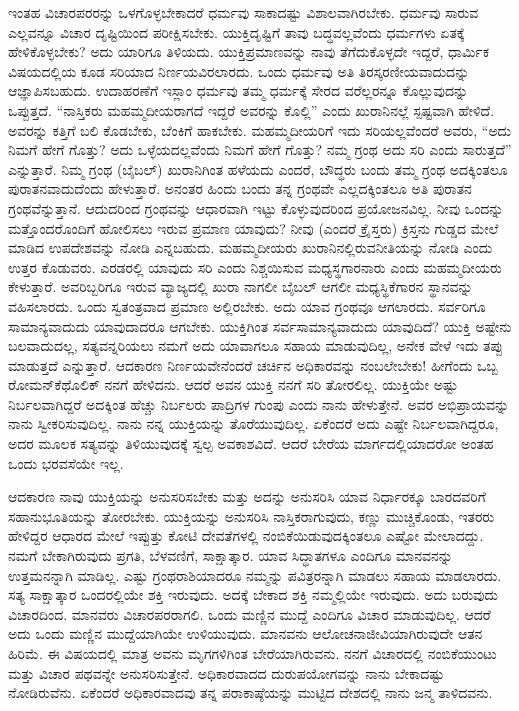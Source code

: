 ಇಂತಹ ವಿಚಾರಪರರನ್ನು ಒಳಗೊಳ್ಳಬೇಕಾದರೆ ಧರ್ಮವು ಸಾಕಾದಷ್ಟು ವಿಶಾಲವಾಗಿರಬೇಕು. ಧರ್ಮವು ಸಾರುವ ಎಲ್ಲವನ್ನೂ ವಿಚಾರ ದೃಷ್ಟಿಯಿಂದ ಪರೀಕ್ಷಿಸಬೇಕು. ಯುಕ್ತಿದೃಷ್ಟಿಗೆ ತಾವು ಬದ್ಧವಲ್ಲವೆಂದು ಧರ್ಮಗಳು ಏತಕ್ಕೆ ಹೇಳಿಕೊಳ್ಳಬೇಕು? ಅದು ಯಾರಿಗೂ ತಿಳಿಯದು. ಯುಕ್ತಿಪ್ರಮಾಣವನ್ನು ನಾವು ತೆಗೆದುಕೊಳ್ಳದೇ ಇದ್ದರೆ, ಧಾರ್ಮಿಕ ವಿಷಯದಲ್ಲಿಯ ಕೂಡ ಸರಿಯಾದ ನಿರ್ಣಯವಿರಲಾರದು. ಒಂದು ಧರ್ಮವು ಅತಿ ತಿರಸ್ಕರಣೀಯವಾದುದನ್ನು ಆಜ್ಞಾಪಿಸಬಹುದು. ಉದಾಹರಣೆಗೆ ಇಸ್ಲಾಂ ಧರ್ಮವು ತಮ್ಮ ಧರ್ಮಕ್ಕೆ ಸೇರದ ವರೆಲ್ಲರನ್ನೂ ಕೊಲ್ಲುವುದನ್ನು ಒಪ್ಪುತ್ತದೆ. “ನಾಸ್ತಿಕರು ಮಹಮ್ಮದೀಯರಾಗದೆ ಇದ್ದರೆ ಅವರನ್ನು ಕೊಲ್ಲಿ” ಎಂದು ಖುರಾನಿನಲ್ಲೆ ಸ್ಪಷ್ಟವಾಗಿ ಹೇಳಿದೆ. ಅವರನ್ನು ಕತ್ತಿಗೆ ಬಲಿ ಕೊಡಬೇಕು, ಬೆಂಕಿಗೆ ಹಾಕಬೇಕು. ಮಹಮ್ಮದೀಯರಿಗೆ ಇದು ಸರಿಯಲ್ಲವೆಂದರೆ ಅವರು, “ಅದು ನಿಮಗೆ ಹೇಗೆ ಗೊತ್ತು? ಅದು ಒಳ್ಳೆಯದಲ್ಲವೆಂದು ನಿಮಗೆ ಹೇಗೆ ಗೊತ್ತು? ನಮ್ಮ ಗ್ರಂಥ ಅದು ಸರಿ ಎಂದು ಸಾರುತ್ತದೆ” ಎನ್ನುತ್ತಾರೆ. ನಿಮ್ಮ ಗ್ರಂಥ (ಬೈಬಲ್​) ಖುರಾನಿಗಿಂತ ಹಳೆಯದು ಎಂದರೆ, ಬೌದ್ಧರು ಬಂದು ತಮ್ಮ ಗ್ರಂಥ ಅದಕ್ಕಿಂತಲೂ ಪುರಾತನವಾದುದೆಂದು ಹೇಳುತ್ತಾರೆ. ಅನಂತರ ಹಿಂದು ಬಂದು ತನ್ನ ಗ್ರಂಥವೇ ಎಲ್ಲದಕ್ಕಿಂತಲೂ ಅತಿ ಪುರಾತನ ಗ್ರಂಥವೆನ್ನುತ್ತಾನೆ. ಆದುದರಿಂದ ಗ್ರಂಥವನ್ನು ಆಧಾರವಾಗಿ ಇಟ್ಟು ಕೊಳ್ಳುವುದರಿಂದ ಪ್ರಯೋಜನವಿಲ್ಲ. ನೀವು ಒಂದನ್ನು ಮತ್ತೊಂದರೊಂದಿಗೆ ಹೋಲಿಸಲು ಇರುವ ಪ್ರಮಾಣ ಯಾವುದು? ನೀವು (ಎಂದರೆ ಕ್ರೈಸ್ತರು) ಕ್ರಿಸ್ತನು ಗುಡ್ಡದ ಮೇಲೆ ಮಾಡಿದ ಉಪದೇಶವನ್ನು ನೋಡಿ ಎನ್ನಬಹುದು. ಮಹಮ್ಮದೀಯರು ಖುರಾನಿನಲ್ಲಿರುವ\break ನೀತಿಯನ್ನು ನೋಡಿ ಎಂದು ಉತ್ತರ ಕೊಡುವರು. ಎರಡರಲ್ಲಿ ಯಾವುದು ಸರಿ ಎಂದು ನಿಶ್ಚಯಿಸುವ ಮಧ್ಯಸ್ಥಗಾರನಾರು ಎಂದು ಮಹಮ್ಮದೀಯರು ಕೇಳುತ್ತಾರೆ. ಅವರಿಬ್ಬರಿಗೂ ಇರುವ ವ್ಯಾಜ್ಯದಲ್ಲಿ ಖುರಾ ನಾಗಲೀ ಬೈಬಲ್​ ಆಗಲೀ ಮಧ್ಯಸ್ಥಿಕೆಗಾರನ ಸ್ಥಾನವನ್ನು ವಹಿಸಲಾರದು. ಒಂದು ಸ್ವತಂತ್ರವಾದ ಪ್ರಮಾಣ ಅಲ್ಲಿರಬೇಕು. ಅದು ಯಾವ ಗ್ರಂಥವೂ ಆಗಲಾರದು. ಸರ್ವರಿಗೂ ಸಾಮಾನ್ಯವಾದುದು ಯಾವುದಾದರೂ ಆಗಬೇಕು. ಯುಕ್ತಿಗಿಂತ ಸರ್ವಸಾಮಾನ್ಯವಾದುದು ಯಾವುದಿದೆ? ಯುಕ್ತಿ ಅಷ್ಟೇನು ಬಲವಾದುದಲ್ಲ, ಸತ್ಯವನ್ನರಿಯಲು ನಮಗೆ ಅದು ಯಾವಾಗಲೂ ಸಹಾಯ ಮಾಡುವುದಿಲ್ಲ, ಅನೇಕ ವೇಳೆ ಇದು ತಪ್ಪು ಮಾಡುತ್ತದೆ ಎನ್ನುತ್ತಾರೆ. ಆದಕಾರಣ ನಿರ್ಣಯವೇನೆಂದರೆ ಚರ್ಚಿನ ಅಧಿಕಾರವನ್ನು ನಂಬಲೇಬೇಕು! ಹೀಗೆಂದು ಒಬ್ಬ ರೋಮನ್​ ಕೆಥೊಲಿಕ್​ ನನಗೆ ಹೇಳಿದನು. ಆದರೆ ಅವನ ಯುಕ್ತಿ ನನಗೆ ಸರಿ ತೋರಲಿಲ್ಲ. ಯುಕ್ತಿಯೇ ಅಷ್ಟು ನಿರ್ಬಲವಾಗಿದ್ದರೆ ಅದಕ್ಕಿಂತ ಹೆಚ್ಚು ನಿರ್ಬಲರು ಪಾದ್ರಿಗಳ ಗುಂಪು ಎಂದು ನಾನು ಹೇಳುತ್ತೇನೆ. ಅವರ ಅಭಿಪ್ರಾಯವನ್ನು ನಾನು ಸ್ವೀಕರಿಸುವುದಿಲ್ಲ. ನಾನು ನನ್ನ ಯುಕ್ತಿಯನ್ನು ತೊರೆಯುವುದಿಲ್ಲ. ಏಕೆಂದರೆ ಅದು ಎಷ್ಟೇ ನಿರ್ಬಲವಾಗಿದ್ದರೂ, ಅದರ ಮೂಲಕ ಸತ್ಯವನ್ನು ತಿಳಿಯುವುದಕ್ಕೆ ಸ್ವಲ್ಪ ಅವಕಾಶವಿದೆ. ಆದರೆ ಬೇರೆಯ ಮಾರ್ಗದಲ್ಲಿಯಾದರೋ ಅಂತಹ ಒಂದು ಭರವಸೆಯೇ ಇಲ್ಲ. 

\vskip 0.2cm

ಆದಕಾರಣ ನಾವು ಯುಕ್ತಿಯನ್ನು ಅನುಸರಿಸಬೇಕು ಮತ್ತು ಅದನ್ನು ಅನುಸರಿಸಿ ಯಾವ ನಿರ್ಧಾರಕ್ಕೂ ಬಾರದವರಿಗೆ ಸಹಾನುಭೂತಿಯನ್ನು ತೋರಬೇಕು. ಯುಕ್ತಿಯನ್ನು ಅನುಸರಿಸಿ ನಾಸ್ತಿಕರಾಗುವುದು, ಕಣ್ಣು ಮುಚ್ಚಿಕೊಂಡು, ಇತರರು ಹೇಳಿದ್ದರ ಆಧಾರದ ಮೇಲೆ ಇಪ್ಪುತ್ತು ಕೋಟಿ ದೇವತೆಗಳಲ್ಲಿ ನಂಬಿಕೆಯಿಡುವುದಕ್ಕಿಂತಲೂ ಎಷ್ಟೋ ಮೇಲಾದದ್ದು. ನಮಗೆ ಬೇಕಾಗಿರುವುದು ಪ್ರಗತಿ, ಬೆಳವಣಿಗೆ, ಸಾಕ್ಷಾತ್ಕಾರ. ಯಾವ ಸಿದ್ಧಾತಗಳೂ ಎಂದಿಗೂ ಮಾನವನನ್ನು ಉತ್ತಮನನ್ನಾಗಿ ಮಾಡಿಲ್ಲ. ಎಷ್ಟು ಗ್ರಂಥರಾಶಿಯಾದರೂ ನಮ್ಮನ್ನು ಪವಿತ್ರರನ್ನಾಗಿ ಮಾಡಲು ಸಹಾಯ ಮಾಡಲಾರದು. ಸತ್ಯ ಸಾಕ್ಷಾತ್ಕಾರ ಒಂದರಲ್ಲಿಯೇ ಶಕ್ತಿ ಇರುವುದು. ಅದಕ್ಕೆ ಬೇಕಾದ ಶಕ್ತಿ ನಮ್ಮಲ್ಲಿಯೇ ಇರುವುದು. ಅದು ಬರುವುದು ವಿಚಾರದಿಂದ. ಮಾನವರು ವಿಚಾರಪರರಾಗಲಿ. ಒಂದು ಮಣ್ಣಿನ ಮುದ್ದೆ ಎಂದಿಗೂ ವಿಚಾರ ಮಾಡುವುದಿಲ್ಲ. ಆದರೆ ಅದು ಒಂದು ಮಣ್ಣಿನ ಮುದ್ದೆಯಾಗಿಯೇ ಉಳಿಯುವುದು. ಮಾನವನು ಆಲೋಚನಾಜೀವಿಯಾಗಿರುವುದೇ ಆತನ ಹಿರಿಮೆ. ಈ ವಿಷಯದಲ್ಲಿ ಮಾತ್ರ ಅವನು ಮೃಗಗಳಿಗಿಂತ ಬೇರೆಯಾಗಿರುವನು. ನನಗೆ ವಿಚಾರದಲ್ಲಿ ನಂಬಿಕೆಯುಂಟು ಮತ್ತು ವಿಚಾರ ಪಥವನ್ನೇ ಅನುಸರಿಸುತ್ತೇನೆ. ಅಧಿಕಾರವಾದದ  ದುರುಪಯೋಗವನ್ನು ನಾನು ಬೇಕಾದಷ್ಟು ನೋಡಿರುವೆನು. ಏಕೆಂದರೆ ಅಧಿಕಾರವಾದವು ತನ್ನ ಪರಾಕಾಷ್ಠೆಯನ್ನು ಮುಟ್ಟಿದ ದೇಶದಲ್ಲಿ ನಾನು ಜನ್ಮ ತಾಳಿದವನು. 

